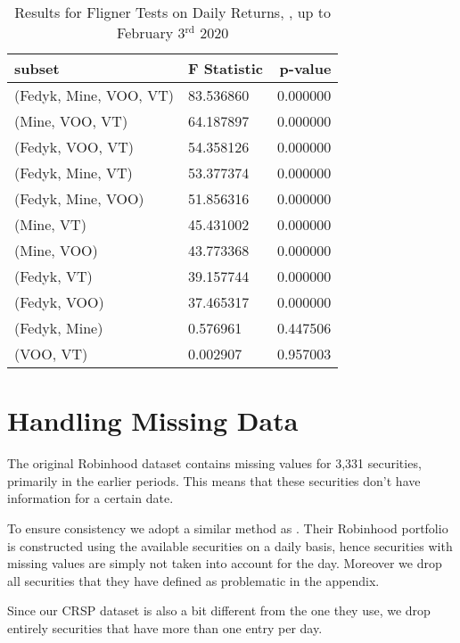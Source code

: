 \begin{appendices}
\begin{table}[ht]
\centering
\caption{Results for Fligner Tests on Daily Returns, , up to February 3$^\text{rd}$ 2020}
    \begin{tabular}{lll}
    \toprule
    \textbf{subset}        & \multicolumn{1}{r}{\textbf{F Statistic}} & \multicolumn{1}{r}{\textbf{p-value}} \\ \midrule
    (Fedyk, Mine, VOO, VT)              & 83.536860                      & 0.000000                       \\
    (Mine, VOO, VT)                     & 64.187897                      & 0.000000                       \\
    (Fedyk, VOO, VT)                    & 54.358126                      & 0.000000                       \\
    (Fedyk, Mine, VT)                   & 53.377374                      & 0.000000                       \\
    (Fedyk, Mine, VOO)                  & 51.856316                      & 0.000000                       \\
    (Mine, VT)                          & 45.431002                      & 0.000000                       \\
    (Mine, VOO)                         & 43.773368                      & 0.000000                       \\
    (Fedyk, VT)                         & 39.157744                      & 0.000000                       \\
    (Fedyk, VOO)                        & 37.465317                      & 0.000000                       \\
    (Fedyk, Mine)                       & 0.576961                       & 0.447506                       \\
    (VOO, VT)                           & 0.002907                       & 0.957003                      
    \end{tabular}
\label{tab:fligner_before}
\end{table}

    


\clearpage
\section{Handling Missing Data}
\label{sec:data}
The original Robinhood dataset contains missing values for 3,331 securities, primarily in the earlier periods. 
This means that these securities don't have information for a certain date.
   
To ensure consistency we adopt a similar method as \cite{Fedyk2024}. Their Robinhood portfolio is constructed using the available securities on a daily basis, 
hence securities with missing values are simply not taken into account for the day. Moreover we drop all securities that they have defined as problematic in the appendix.

Since our CRSP dataset is also a bit different from the one they use, we drop entirely securities that have more than one entry per day.


\end{appendices}